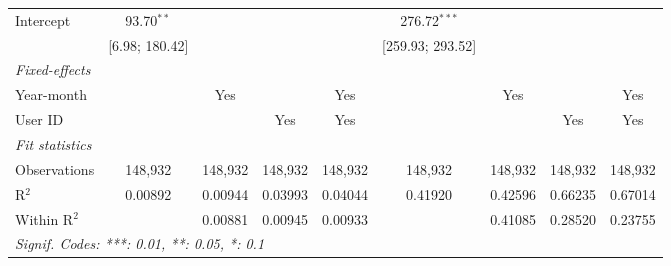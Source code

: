 \begin{table}[htbp]
\begin{threeparttable}[b]
\begin{tabular}{lcccccccc}
         Intercept                       & 93.70$^{**}$      &                   &                   &                   & 276.72$^{***}$     &                  &                    &   \\   
                                         & [6.98; 180.42]    &                   &                   &                   & [259.93; 293.52]   &                  &                    &   \\   
         \midrule
         \emph{Fixed-effects}\\
         Year-month                      &                   & Yes               &                   & Yes               &                    & Yes              &                    & Yes\\  
         User ID                         &                   &                   & Yes               & Yes               &                    &                  & Yes                & Yes\\  
         \midrule
         \emph{Fit statistics}\\
         Observations                    & 148,932           & 148,932           & 148,932           & 148,932           & 148,932            & 148,932          & 148,932            & 148,932\\  
         R$^2$                           & 0.00892           & 0.00944           & 0.03993           & 0.04044           & 0.41920            & 0.42596          & 0.66235            & 0.67014\\  
         Within R$^2$                    &                   & 0.00881           & 0.00945           & 0.00933           &                    & 0.41085          & 0.28520            & 0.23755\\  
         \midrule \midrule
         \multicolumn{9}{l}{\emph{Signif. Codes: ***: 0.01, **: 0.05, *: 0.1}}\\
      \end{tabular}
   \end{threeparttable}
\end{table}


